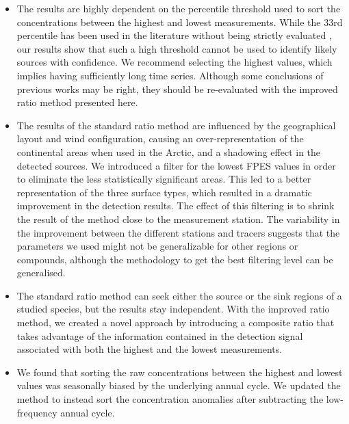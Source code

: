     \begin{itemize}
        \item The results are highly dependent on the percentile threshold used to sort the concentrations between the highest and lowest measurements.
        While the 33rd percentile has been used in the literature without being strictly evaluated \citep{irish_ice_2019}, our results show that such a high threshold cannot be used to identify likely sources with confidence. We recommend selecting the  highest values, which implies having sufficiently long time series.
        Although some conclusions of previous works may be right, they should be re-evaluated with the improved ratio method presented here.

        \item The results of the standard ratio method are influenced by the geographical layout and wind configuration, causing an over-representation of the continental areas when used in the Arctic, and a shadowing effect in the detected sources.
        We introduced a filter for the lowest FPES values in order to eliminate the less statistically significant areas.
        This led to a better representation of the three surface types, which resulted in a dramatic improvement in the detection results.
        The effect of this filtering is to shrink the result of the method close to the measurement station. The variability in the improvement between the different stations and tracers suggests that the parameters we used might not be generalizable for other regions or compounds, although the methodology to get the best filtering level can be generalised.

        \item The standard ratio method can seek either the source or the sink regions of a studied species, but the results stay independent.
        With the improved ratio method, we created a novel approach by introducing  a composite ratio that takes advantage of the information contained in the detection signal associated with both the highest and the lowest measurements.

        \item We found that sorting the raw concentrations between the highest and lowest values was seasonally biased by the underlying annual cycle.
        We updated the method to instead sort the concentration anomalies after subtracting the low-frequency annual cycle.
    \end{itemize}

